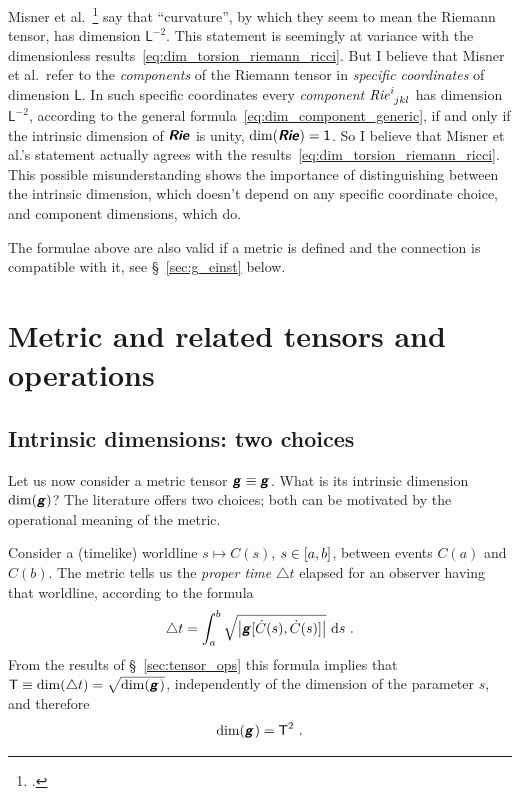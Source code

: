 \documentclass[\ifafour a4paper,12pt,\else a5paper,10pt,\fi%
onecolumn,oneside,article,%
british%
]{memoir}
\makeatletter
\theoremstyle{remark}
\theoremstyle{innote}
\newcommand*{\mathte}[1]{\textbf{\textit{\textsf{#1}}}}
\newcommand*{\citep}{\footcites}
\newcommand*{\di}{\mathrm{d}}%
\newcommand*{\incr}{\triangle}%
\DeclarePairedDelimiter\clcl{[}{]}
\DeclarePairedDelimiter\abs{\lvert}{\rvert}
\renewcommand*{\|}[1][]{\nonscript\,#1\vert\nonscript\;\mathopen{}}
\newcommand*{\sect}{\S}%
\newcommand*{\etal}{{et al.}}
\newcommand*{\q}{}%
\DeclareRobustCommand*{\q}{%
  \mathord{\mathpalette\bigcdot@{}}%
}
\newcommand*{\bigcdot@scalefactor}{0.7}
\newcommand*{\bigcdot@widthfactor}{1.5}
\newcommand*{\bigcdot@}[2]{%
  \sbox0{$#1\vcenter{}$}%
  \sbox2{$#1\cdot\m@th$}%
  \hbox to \bigcdot@widthfactor\wd2{%
    \hfil
    \raise\ht0\hbox{%
      \scalebox{\bigcdot@scalefactor}{%
        \lower\ht0\hbox{$#1\bullet\m@th$}%
      }%
    }%
    \hfil
  }%
}
\newcommand*{\Un}{\textsf{1}}
\newcommand*{\Le}{\textsf{L}}
\newcommand*{\Ti}{\textsf{T}}
\newcommand*{\yg}{\mathte{g}}
\newcommand*{\yR}{\mathte{Rie}}
\renewcommand*{\i}{\indices}
\newcommand*{\inct}{\incr t}
\newcommand*{\yC}{\dot{C}}
\makeatother
\begin{document}
Misner \etal\ \citep[p.~35%
]{misneretal1970_r1973} say that \enquote{curvature}, by which they seem to
mean the Riemann tensor, has dimension $\Le^{-2}$. This statement is
seemingly at variance with the dimensionless
results~\eqref{eq:dim_torsion_riemann_ricci}. But I believe that Misner
\etal\ refer to the \emph{components} of the Riemann tensor in
\emph{specific coordinates} of dimension $\Le$. In such specific
coordinates every \emph{component} $\mathit{Rie}\i{^{i}_{jkl}}$ has
dimension $\Le^{-2}$, according to the general
formula~\eqref{eq:dim_component_generic}, if and only if the intrinsic
dimension of $\yR$ is unity, $\dim(\yR)=\Un$. So I believe that Misner
\etal's statement actually agrees with the
results~\eqref{eq:dim_torsion_riemann_ricci}. This possible
misunderstanding shows the importance of distinguishing between the
intrinsic dimension, which doesn't depend on any specific coordinate
choice, and component dimensions, which do.

The formulae above are also valid if a metric is defined and the connection
is compatible with it, see \sect~\ref{sec:g_einst} below.


\section{Metric and related tensors and operations}
\label{sec:metric}

\subsection{Intrinsic dimensions: two choices}
\label{sec:g_intr_dim}

Let us now consider a metric tensor $\yg \equiv \yg\i{_{\q\q}}$. What is
its intrinsic dimension $\dim(\yg)$? The literature offers two choices;
both can be motivated by the operational meaning of the metric.


Consider a (timelike) worldline $s \mapsto C(s)$, $s\in \clcl{a,b}$,
between events $C(a)$ and $C(b)$. The metric tells us the \emph{proper
  time} $\inct$ elapsed for an observer having that worldline, according to
the formula
\begin{equation}%
  \label{eq:proper_time}
\inct =  \int_a^b
\sqrt{\abs*{\yg[\yC(s),\yC(s)]}} \  \di s\ .
\end{equation}
From the results of \sect~\ref{sec:tensor_ops} this formula implies that
 $\Ti \equiv \dim(\inct) = \sqrt{\dim(\yg\i{_{\q\q}})}$,
 independently of the dimension of the parameter $s$, and therefore
\begin{equation}%
  \label{eq:dim_g}
  \dim(\yg\i{_{\q\q}}) = \Ti^{2}\ .
\end{equation}
\end{document}

